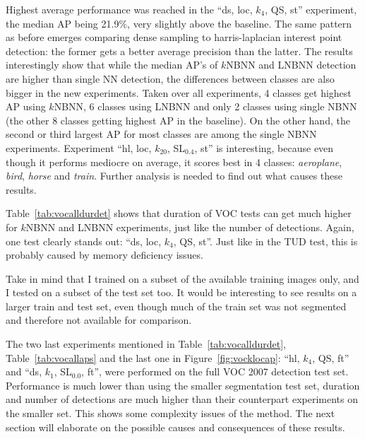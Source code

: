 Highest average performance was reached in the ``ds, loc, $k_4$, QS, st'' experiment, the median AP being 21.9\%, very slightly above the baseline. The same pattern as before emerges comparing dense sampling to harris-laplacian interest point detection: the former gets a better average precision than the latter. The results interestingly show that while the median AP's of $k$NBNN and LNBNN detection are higher than single NN detection, the differences between classes are also bigger in the new experiments. Taken over all experiments, 4 classes get highest AP using $k$NBNN, 6 classes using LNBNN and only 2 classes using single NBNN (the other 8 classes getting highest AP in the baseline). On the other hand, the second or third largest AP for most classes are among the single NBNN experiments. Experiment ``hl, loc, $k_{20}$, SL$_{0.4}$, st'' is interesting, because even though it performs mediocre on average, it scores best in 4 classes: \emph{aeroplane}, \emph{bird}, \emph{horse} and \emph{train}. Further analysis is needed to find out what causes these results.

Table~\ref{tab:vocalldurdet} shows that duration of VOC tests can get much higher for $k$NBNN and LNBNN experiments, just like the number of detections. Again, one test clearly stands out: ``ds, loc, $k_4$, QS, st''. Just like in the TUD test, this is probably caused by memory deficiency issues.

Take in mind that I trained on a subset of the available training images only, and I tested on a subset of the test set too. It would be interesting to see results on a larger train and test set, even though much of the train set was not segmented and therefore not available for comparison.

The two last experiments mentioned in Table~\ref{tab:vocalldurdet}, Table~\ref{tab:vocallaps} and the last one in Figure~\ref{fig:vocklocap}: ``hl, $k_4$, QS, ft'' and ``ds, $k_1$, SL$_{0.0}$, ft'',  were performed on the full VOC 2007 detection test set. Performance is much lower than using the smaller segmentation test set, duration and number of detections are much higher than their counterpart experiments on the smaller set. This shows some complexity issues of the method. The next section will elaborate on the possible causes and consequences of these results.

